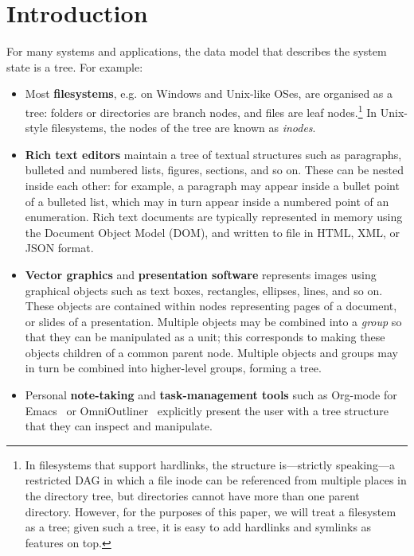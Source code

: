 \documentclass[sigconf]{acmart}
\begin{document}
\section{Introduction}\label{sec:intro}

For many systems and applications, the data model that describes the system state is a tree.
For example:
\begin{itemize}
    \item Most \textbf{filesystems}, e.g. on Windows and Unix-like OSes, are organised as a tree: folders or directories are branch nodes, and files are leaf nodes.\footnote{In filesystems that support hardlinks, the structure is---strictly speaking---a restricted DAG in which a file inode can be referenced from multiple places in the directory tree, but directories cannot have more than one parent directory.
        However, for the purposes of this paper, we will treat a filesystem as a tree; given such a tree, it is easy to add hardlinks and symlinks as features on top.}
        In Unix-style filesystems, the nodes of the tree are known as \emph{inodes}.
    \item \textbf{Rich text editors} maintain a tree of textual structures such as paragraphs, bulleted and numbered lists, figures, sections, and so on.
        These can be nested inside each other: for example, a paragraph may appear inside a bullet point of a bulleted list, which may in turn appear inside a numbered point of an enumeration.
        Rich text documents are typically represented in memory using the Document Object Model (DOM), and written to file in HTML, XML, or JSON format.
    \item \textbf{Vector graphics} and \textbf{presentation software} represents images using graphical objects such as text boxes, rectangles, ellipses, lines, and so on.
        These objects are contained within nodes representing pages of a document, or slides of a presentation.
        Multiple objects may be combined into a \emph{group} so that they can be manipulated as a unit; this corresponds to making these objects children of a common parent node.
        Multiple objects and groups may in turn be combined into higher-level groups, forming a tree.
    \item Personal \textbf{note-taking} and \textbf{task-management tools} such as Org-mode for Emacs~\cite{OrgMode} or OmniOutliner~\cite{OmniOutliner} explicitly present the user with a tree structure that they can inspect and manipulate.
\end{itemize}
\end{document}
